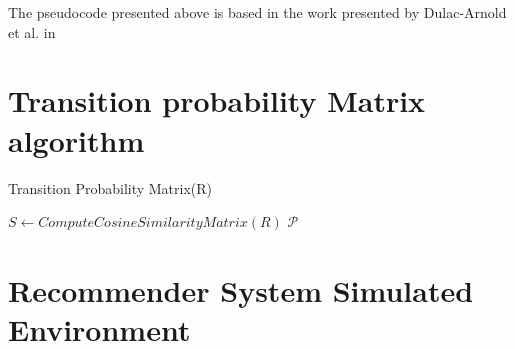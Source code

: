 The pseudocode presented above is based in the work presented by Dulac-Arnold et al. in \cite{Dulac-Arnold2015}

\chapter{Transition probability Matrix algorithm}
\label{app:trans_prob_alg}

\begin{center}
 \begin{algorithm}[!htbp]
    \DontPrintSemicolon
    \caption{Transition Probability Matrix(R)}
    \label{alg:transition_matrix}
    
    $S \leftarrow ComputeCosineSimilarityMatrix(R)$\;
    \KwRet $\mathcal{P}$
  \end{algorithm}
\end{center}

\chapter{Recommender System Simulated Environment}
\label{app:simulated_env}

